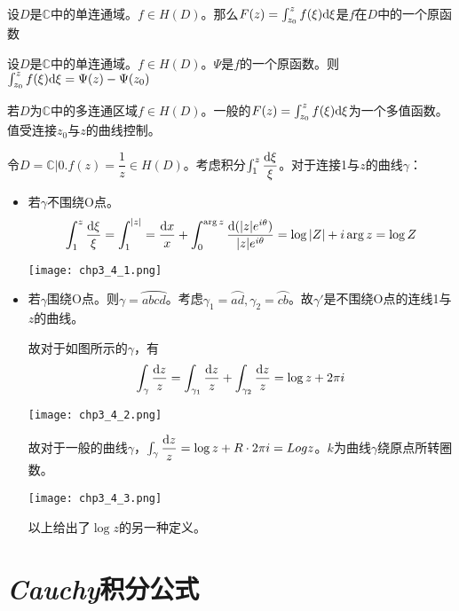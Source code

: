 \begin{theorem}
	设$D$是$\mathbb{C}$中的单连通域。$f\in H(D)$。那么$F(z)=\int_{z_0}^{z}f(\xi)\mathrm{d}\xi$是$f$在$D$中的一个原函数
\end{theorem}
\begin{theorem}
	设$D$是$\mathbb{C}$中的单连通域。$f\in H(D)$。$\Psi$是$f$的一个原函数。则$\int_{z_0}^{z}f(\xi)\mathrm{d}\xi=\Psi(z)-\Psi(z_0)$
\end{theorem}

若$D$为$\mathbb{C}$中的多连通区域$f\in H(D)$。一般的$F(z)=\int_{z_0}^{z}f(\xi)\mathrm{d}\xi$为一个多值函数。值受连接$z_0$与$z$的曲线控制。

令$D=\mathbb{C}|{0}.f(z)=\dfrac{1}{z}\in H(D)$。考虑积分$\int_{1}^{z}\dfrac{\mathrm{d}\xi}{\xi}$。对于连接1与$z$的曲线$\gamma$：
\begin{itemize}
	\item 若$\gamma$不围绕O点。
	\[\int_{1}^{z}\dfrac{\mathrm{d}\xi}{\xi}=\int_{1}^{|z|}=\dfrac{\mathrm{d}x}{x}+\int_{0}^{\arg z}\dfrac{\mathrm{d}(|z|e^{i\theta})}{|z|e^{i\theta}}=\log|Z|+i\arg z=\log Z\]
	\begin{center}
		\texttt{[image: chp3\_4\_1.png]}
	\end{center}
	\item 若$\gamma$围绕O点。则$\gamma=\wideparen{abcd}$。考虑$\gamma_1=\wideparen{ad},\gamma_2=\wideparen{cb}$。故$\gamma'$是不围绕O点的连线1与$z$的曲线。
	
	故对于如图所示的$\gamma$，有
	\[\int_\gamma\dfrac{\mathrm{d}z}{z}=\int_{\gamma_1}\dfrac{\mathrm{d}z}{z}+\int_{\gamma_2}\dfrac{\mathrm{d}z}{z}=\log z+2\pi i\]
	\begin{center}
		\texttt{[image: chp3\_4\_2.png]}
	\end{center}
	故对于一般的曲线$\gamma$，$\int_\gamma\dfrac{\mathrm{d}z}{z}=\log z+R\cdot2\pi i=Logz$。$k$为曲线$\gamma$绕原点所转圈数。
	\begin{center}
		\texttt{[image: chp3\_4\_3.png]}
	\end{center}
	以上给出了$\log z$的另一种定义。
\end{itemize}


\section{\emph{Cauchy}积分公式}

